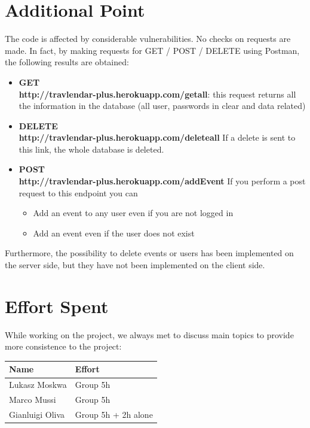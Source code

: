 \documentclass[numbers=noenddot, 12pt, a4paper, oneside]{scrbook}
\begin{document}
\chapter{Additional Point}
The code is affected by considerable vulnerabilities. No checks on requests are made. In fact, by making requests for GET / POST / DELETE using Postman, the following results are obtained:
\begin{itemize}
	\item \textbf{GET}\\ \textbf{http://travlendar-plus.herokuapp.com/getall}: this request returns all the information in the database (all user, passwords in clear and data related)
	\item \textbf{DELETE}\\ \textbf{http://travlendar-plus.herokuapp.com/deleteall} If a delete is sent to this link, the whole database is deleted.
	\item \textbf{POST}\\
	\textbf{http://travlendar-plus.herokuapp.com/addEvent} If you perform a post request to this endpoint you can
	\begin{itemize}
		\item Add an event to any user even if you are not logged in
		\item Add an event even if the user does not exist
	\end{itemize} 
\end{itemize}
Furthermore, the possibility to delete events or users has been implemented on the server side, but they have not been implemented on the client side.\\

\chapter{Effort Spent}

While working on the project, we always met to discuss main topics to provide more consistence to the project:\\

\begin{tabular}{|p{}|p{}|}
	\hline
	\parbox[c][6ex]{6ex}{\centering \textbf{Name}} & \textbf{Effort}
	\\
	\hline
	\parbox[c][8ex]{6ex}{\centering Lukasz Moskwa} & Group 5h\\
	\hline
	\parbox[c][8ex]{6ex}{\centering Marco Mussi} & Group 5h\\
	\hline
	\parbox[c][8ex]{6ex}{\centering Gianluigi Oliva} & Group 5h + 2h alone\\
	\hline
	
	
	
\end{tabular}
\end{document}
